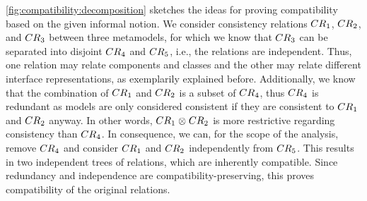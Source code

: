 \autoref{fig:compatibility:decomposition} sketches the ideas for proving compatibility based on the given informal notion.
We consider consistency relations $\consistencyrelation{CR}{1}$, $\consistencyrelation{CR}{2}$, and $\consistencyrelation{CR}{3}$ between three metamodels, for which we know that $\consistencyrelation{CR}{3}$ can be separated into disjoint $\consistencyrelation{CR}{4}$ and $\consistencyrelation{CR}{5}$, i.e., the relations are independent.
Thus, one relation may relate components and classes and the other may relate different interface representations, as exemplarily explained before.
Additionally, we know that the combination of $\consistencyrelation{CR}{1}$ and $\consistencyrelation{CR}{2}$ is a subset of $\consistencyrelation{CR}{4}$, thus $\consistencyrelation{CR}{4}$ is redundant as models are only considered consistent if they are consistent to $\consistencyrelation{CR}{1}$ and $\consistencyrelation{CR}{2}$ anyway.
In other words, $\consistencyrelation{CR}{1} \concat \consistencyrelation{CR}{2}$ is more restrictive regarding consistency than $\consistencyrelation{CR}{4}$.
In consequence, we can, for the scope of the analysis, remove $\consistencyrelation{CR}{4}$ and consider $\consistencyrelation{CR}{1}$ and $\consistencyrelation{CR}{2}$ independently from $\consistencyrelation{CR}{5}$.
This results in two independent trees of relations, which are inherently compatible.
Since redundancy and independence are compatibility-preserving, this proves compatibility of the original relations.

